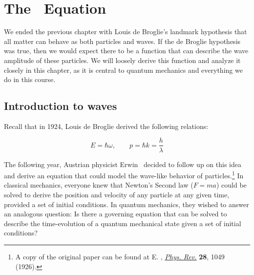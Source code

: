 %

%

\chapter{The \Sch\ Equation} \label{ch:sch}
We ended the previous chapter with Louis de Broglie's landmark hypothesis that all matter can behave as both particles and waves. If the de Broglie hypothesis was true, then we would expect there to be a function that can describe the wave amplitude of these particles. We will loosely derive this function and analyze it closely in this chapter, as it is central to quantum mechanics and everything we do in this course. \par 

\section{Introduction to waves}
Recall that in 1924, Louis de Broglie derived the following relations:
\begin{tcolorbox}[title=de Broglie relations] \vspace{-2ex}
	\begin{equation*}
		E=\hbar\omega, \qquad p = \hbar k = \frac{h}{\lambda}
	\end{equation*}
\end{tcolorbox}
The following year, Austrian physicist Erwin \Sch\ decided to follow up on this idea and derive an equation that could model the wave-like behavior of particles.\footnote{A copy of the original paper can be found at E. \Sch, \href{https://journals.aps.org/pr/abstract/10.1103/PhysRev.28.1049}{\emph{Phys. Rev.}} \textbf{28}, 1049 (1926).} In classical mechanics, everyone knew that Newton's Second law ($F=ma$) could be solved to derive the position and velocity of any particle at any given time, provided a set of initial conditions. In quantum mechanics, they wished to answer an analogous question: Is there a governing equation that can be solved to describe the time-evolution of a quantum mechanical state given a set of initial conditions? \par 

